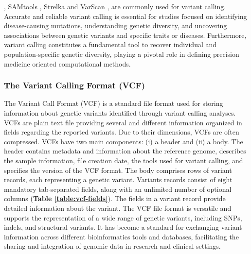 \documentclass[a4paper, titlepage, openright]{book}
\begin{document}
\citep{mckenna2010genome}, SAMtools \citep{li2009sequence}, Strelka \citep{kim2018strelka2} and VarScan \citep{koboldt2012varscan}, are commonly used for variant calling. Accurate and reliable variant calling is essential for studies focused on identifying disease-causing mutations, understanding genetic diversity, and uncovering associations between genetic variants and specific traits or diseases. Furthermore, variant calling constitutes a fundamental tool to recover individual and population-specific genetic diversity, playing a pivotal role in defining precision medicine oriented computational methods.

\subsubsection{The Variant Calling Format (VCF)}
The Variant Call Format (VCF) is a standard file format used for storing information about genetic variants identified through variant calling analyses. VCFs are plain text file providing several and different information organized in fields regarding the reported variants. Due to their dimensions, VCFs are often compressed. VCFs have two main components: (i) a header and (ii) a body. The header contains metadata and information about the reference genome, describes the sample information, file creation date, the tools used for variant calling, and specifies the version of the VCF format. The body comprises rows of variant records, each representing a genetic variant.  Variants records consist of eight mandatory tab-separated fields, along with an unlimited number of optional columns (\textbf{Table \ref{table:vcf-fields}}). The fields in a variant record provide detailed information about the variant. The VCF file format is versatile and supports the representation of a wide range of genetic variants, including SNPs, indels, and structural variants. It has become a standard for exchanging variant information across different bioinformatics tools and databases, facilitating the sharing and integration of genomic data in research and clinical settings.
 
\end{document}

